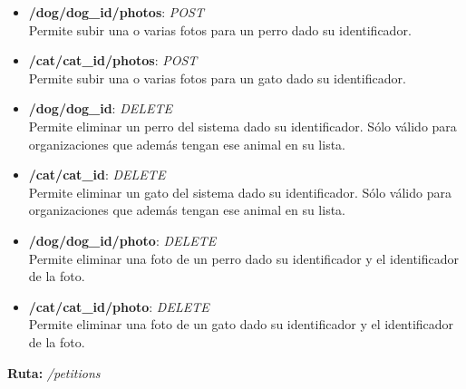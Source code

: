 \begin{itemize}
    \item \textbf{/dog/{dog\_id}/photos}: \textit{POST} \\
    Permite subir una o varias fotos para un perro dado su identificador.
    \item \textbf{/cat/{cat\_id}/photos}: \textit{POST} \\
    Permite subir una o varias fotos para un gato dado su identificador.
    \item \textbf{/dog/{dog\_id}}: \textit{DELETE} \\
    Permite eliminar un perro del sistema dado su identificador. Sólo válido para organizaciones que además tengan ese animal en su lista.
    \item \textbf{/cat/{cat\_id}}: \textit{DELETE} \\
    Permite eliminar un gato del sistema dado su identificador. Sólo válido para organizaciones que además tengan ese animal en su lista.
    \item \textbf{/dog/{dog\_id}/photo}: \textit{DELETE} \\
    Permite eliminar una foto de un perro dado su identificador y el identificador de la foto.
    \item \textbf{/cat/{cat\_id}/photo}: \textit{DELETE} \\
    Permite eliminar una foto de un gato dado su identificador y el identificador de la foto.
\end{itemize}


\textbf{Ruta:} \textit{/petitions}

